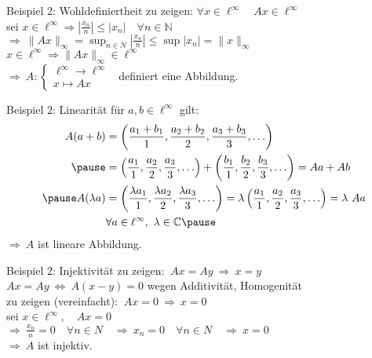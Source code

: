 \documentclass[AERbeamer%
,handout%
,optBeamerClassicFormat%
,optLeftEquations   %
]{AERlatex}
\begin{document}
%
    \begin{frame}{Beispiel 2: Wohldefiniertheit}
        \setlength{\baselineskip}{1.6\baselineskip}
        zu zeigen: $\forall x \in \ell^{\infty} \quad A x \in \ell^{\infty}$ \\ \pause
        sei $x \in \ell^{\infty} \Rightarrow\left|\frac{x_n}{n}\right| \leq\left|x_n\right| \quad \forall n \in \mathbb{N}$ \\ \pause
        $\Rightarrow ~ \|A x\|_{\infty}=\sup _{n \in N}\left|\frac{x_n}{n}\right| \leq \sup \left|x_n\right|=\|x\|_{\infty}$ \\ \pause
        $x \in \ell^{\infty} \Rightarrow\|A x\|_{\infty} \in \ell^{\infty}$ \\ \pause
        \vspace{1em}
        $\Rightarrow ~ A:\left\{\begin{array}{l}
                                    \ell^{\infty} \rightarrow \ell^{\infty} \\ x \mapsto A x
        \end{array} \right.~$ definiert eine Abbildung.
    \end{frame}
%
    \begin{frame}{Beispiel 2: Linearität}
        \setlength{\baselineskip}{1.6\baselineskip}
        für $a, b \in \ell^{\infty}$ gilt:
        \begin{equation*}
            \begin{aligned}
                A(a+b)&=\left(\frac{a_1+b_1}{1}, \frac{a_2+b_2}{2}, \frac{a_3+b_3}{3}, \ldots\right) \\ \pause
                &=\left(\frac{a_1}{1}, \frac{a_2}{2}, \frac{a_3}{3}, \ldots\right)+\left(\frac{b_1}{1}, \frac{b_2}{2}, \frac{b_3}{3}, \ldots\right)=A a+A b \\ \pause
                A(\lambda a)&=\left(\frac{\lambda a_1}{1}, \frac{\lambda a_2}{2}, \frac{\lambda a_3}{3}, \ldots\right)=\lambda\left(\frac{a_1}{1}, \frac{a_2}{2}, \frac{a_3}{3}, \ldots\right)=\lambda ~ A a \\ & \forall a \in \ell^{\infty}, ~\lambda \in \mathbb{C} \pause
            \end{aligned}
        \end{equation*}
        $\Rightarrow ~ A$  ist lineare Abbildung.
    \end{frame}
%
    \begin{frame}{Beispiel 2: Injektivität}
        \setlength{\baselineskip}{1.6\baselineskip}
        zu zeigen: $~ A x=A y ~ \Rightarrow ~ x=y$ \\ \pause
        $A x=A y ~ \Leftrightarrow ~ A(x-y)=0$ wegen Additivität, Homogenität \\ \pause
        zu zeigen (vereinfacht): $~ A x=0 ~ \Rightarrow ~ x=0$ \\ \pause
        sei $x \in \ell^{\infty}, \quad A x=0$ \\ \pause
        $\Rightarrow ~ \frac{x_n}{n}=0 \quad \forall n \in N \quad \Rightarrow ~ x_n=0 \quad \forall n \in N \quad \Rightarrow ~ x=0$ \\ \pause
        $\Rightarrow ~ A$ ist injektiv.
    \end{frame}
\end{document}

